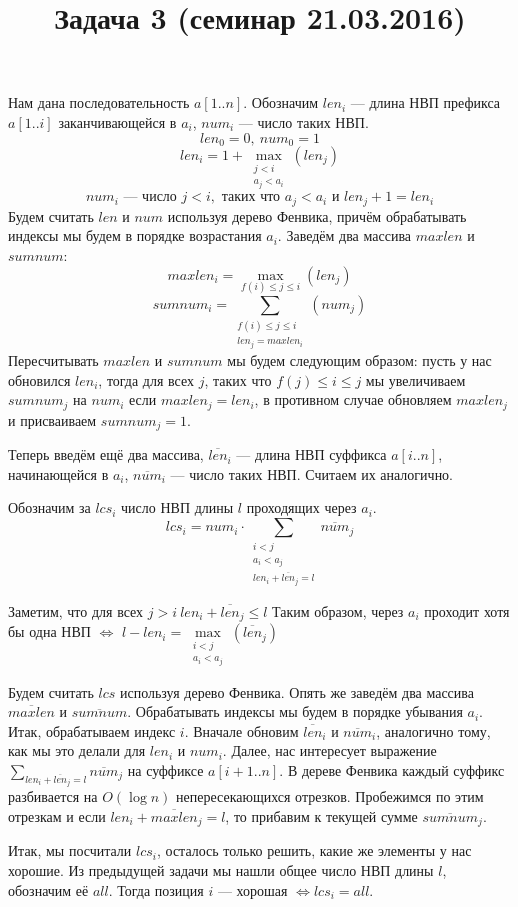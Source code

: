 \documentclass{article}
\title{Задача 3 (семинар 21.03.2016)}
\author{}
\date{}
\newcommand{\olen}{\overline{len}}
\newcommand{\onum}{\overline{num}}
\newcommand{\omaxlen}{\overline{maxlen}}
\newcommand{\osumnum}{\overline{sumnum}}
\newcommand{\logn}{\log n}
\newcommand{\Ologn}{O(\logn)}
\begin{document}
\maketitle
Нам дана последовательность $a[1..n]$.
Обозначим $len_i$ --- длина НВП префикса $a[1..i]$ заканчивающейся в $a_i$, $num_i$ --- число таких НВП. 
$$len_0=0,\ num_0 = 1$$
$$len_i=1+\max\limits_{\substack{j<i\\ a_j<a_i}}(len_j)$$
$$num_i\text{ --- число } j<i, \text{ таких что } a_j<a_i \text{ и } len_j+1=len_i$$
Будем считать $len$ и $num$ используя дерево Фенвика, причём обрабатывать индексы мы будем в порядке возрастания $a_i$. Заведём два массива $maxlen$ и $sumnum$: 
$$maxlen_i=\max\limits_{f(i) \leq j \leq i}(len_j)$$
$$sumnum_i=\sum\limits_{\substack{f(i) \leq j \leq i\\ len_j=maxlen_i}}(num_j)$$
Пересчитывать $maxlen$ и $sumnum$ мы будем следующим образом: пусть у нас обновился $len_i$, тогда для всех $j$, таких что $f(j)\leq i\leq j$ мы увеличиваем $sumnum_j$ на $num_i$ если $maxlen_j=len_i$, в противном случае обновляем $maxlen_j$ и присваиваем $sumnum_j=1$.

Теперь введём ещё два массива, $\olen_i$ --- длина НВП суффикса $a[i..n]$, начинающейся в $a_i$, $\onum_i$ --- число таких НВП. Считаем их аналогично.

Обозначим за $lcs_i$ число НВП длины $l$ проходящих через $a_i$.
$$lcs_i=num_i\cdot \sum\limits_{\substack{i<j\\ a_i<a_j\\ len_i+\olen_j=l}}\onum_j$$

Заметим, что для всех $j>i\ len_i+\olen_j\leq l$
Таким образом, через $a_i$ проходит хотя бы одна НВП $\iff$ $l-len_i=\max\limits_{\substack{i<j\\ a_i<a_j}}(\olen_j)$

Будем считать $lcs$ используя дерево Фенвика. Опять же заведём два массива $\omaxlen$ и $\osumnum$. Обрабатывать индексы мы будем в порядке убывания $a_i$. Итак, обрабатываем индекс $i$. Вначале обновим $\olen_i$ и $\onum_i$, аналогично тому, как мы это делали для $len_i$ и $num_i$. Далее, нас интересует выражение $\sum\limits_{len_i+\olen_j=l}\onum_j$ на суффиксе $a[i+1..n]$. В дереве Фенвика каждый суффикс разбивается на $\Ologn$ непересекающихся отрезков. Пробежимся по этим отрезкам и если $len_i+\omaxlen_j=l$, то прибавим к текущей сумме $\osumnum_j$.

Итак, мы посчитали $lcs_i$, осталось только решить, какие же элементы у нас хорошие. Из предыдущей задачи мы нашли общее число НВП длины $l$, обозначим её $all$. Тогда позиция $i$ --- хорошая $\iff lcs_i=all$.
\end{document}
